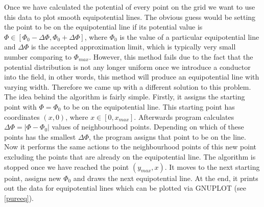 \documentclass[aps,twocolumn,pre,nofootinbib,10pt]{revtex4-1}
\begin{document}
Once we have calculated the potential of every point on the grid we want to use this data to plot smooth equipotential lines. The obvious guess would be setting the point to be on the equipotential line if its potential value is \begin{math} \Phi \in [\Phi_0 - \Delta \Phi, \Phi_0 + \Delta \Phi] \end{math}, where \begin{math} \Phi_0 \end{math} is the value of a particular equipotential line and \begin{math} \Delta \Phi \end{math} is the accepted approximation limit, which is typically very small number comparing to \begin{math} \Phi_{max} \end{math}. However, this method fails due to the fact that the potential distribution is not any longer uniform once we introduce a conductor into the field, in other words, this method will produce an equipotential line with varying width. Therefore we came up with a different solution to this problem. The idea behind the algorithm is fairly simple. Firstly, it assigns the starting point with \begin{math} \Phi = \Phi_0 \end{math} to be on the equipotential line. This 
starting point has coordinates \begin{math}(x,0)\end{math}, where \begin{math} x \in [0,x_{max}] \end{math}. Afterwards program calculates \begin{math} \Delta \Phi = |\Phi - \Phi_0| \end{math} values of neighbourhood points. Depending on which of these points has the smallest \begin{math} \Delta \Phi \end{math}, the program assigns that point to be on the line. Now it performs the same actions to the neighbourhood points of this new point excluding the points that are already on the equipotential line. The algorithm is stopped once we have reached the point \begin{math} (y_{max},x) \end{math}. It moves to the next starting point, assigns new \begin{math} \Phi_0 \end{math} and draws the next equipotential line. At the end, it prints out the data for equipotential lines which can be plotted via GNUPLOT (see \ref{pureeq}).
\end{document}
